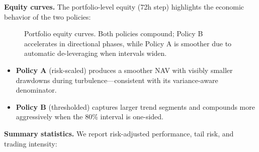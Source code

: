 \documentclass[
  a4paper,
  DIV=11,
  numbers=noendperiod]{scrreprt}
\providecommand{\tightlist}{%
  \setlength{\itemsep}{0pt}\setlength{\parskip}{0pt}}
\begin{document}
\textbf{Equity curves.} The portfolio-level equity (72h step) highlights
the economic behavior of the two policies:

\begin{figure}


\caption{\label{fig-equity-portfolio}Portfolio equity curves. Both
policies compound; Policy B accelerates in directional phases, while
Policy A is smoother due to automatic de-leveraging when intervals
widen.}

\end{figure}%

\begin{itemize}
\tightlist
\item
  \textbf{Policy A} (risk-scaled) produces a smoother NAV with visibly
  smaller drawdowns during turbulence---consistent with its
  variance-aware denominator.
\item
  \textbf{Policy B} (thresholded) captures larger trend segments and
  compounds more aggressively when the 80\% interval is one-sided.
\end{itemize}

\textbf{Summary statistics.} We report risk-adjusted performance, tail
risk, and trading intensity:
\end{document}
